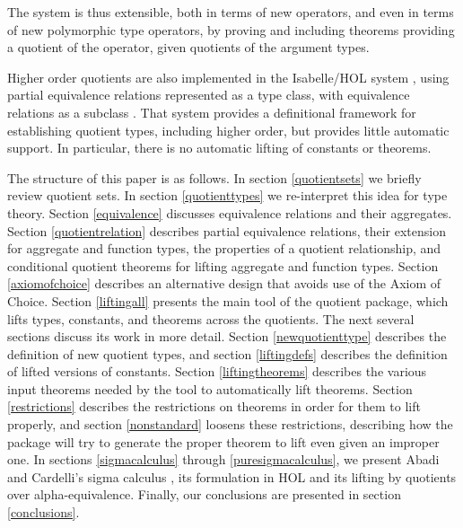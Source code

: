\documentclass[envcountsame,runningheads]{llncs}
\newcommand{\quotient}{partial equivalence}
\begin{document}
The system is thus extensible, both in terms of new operators, and even
in terms of new polymorphic type operators,
by proving and including
theorems providing
a quotient
of the operator,
given quotients
of the argument types.

Higher order quotients are also implemented in the Isabelle/HOL system
\cite{NiPaWe02},
using \quotient{} relations represented as a type class,
with equivalence relations as a subclass
\cite{Slo97}.
That system provides a definitional framework for establishing quotient
types, including higher order, but provides little automatic support.
In particular, there is
no automatic lifting of constants or theorems.

The structure of this paper is as follows.  In section \ref{quotientsets}
we briefly review quotient sets.  In section \ref{quotienttypes} we
re-interpret this idea for type theory. 
Section \ref{equivalence} discusses equivalence relations and their
aggregates.
Section \ref{quotientrelation} describes \quotient{} relations,
their extension for aggregate and function types,
the properties of a quotient relationship,
and conditional quotient theorems
for lifting aggregate and function types.
Section \ref{axiomofchoice} describes an alternative design
that avoids use of the Axiom of Choice.
Section \ref{liftingall} presents
the main tool of the quotient package, which lifts types, constants,
and theorems across the quotients.
The next several sections discuss
its work
in more detail.
Section \ref{newquotienttype}
describes the definition of new quotient types, and 
section \ref{liftingdefs} describes the definition of lifted versions
of constants.
Section \ref{liftingtheorems} describes the various input theorems needed by
the tool to automatically lift theorems.
Section \ref{restrictions} describes the restrictions on theorems
in order for them to lift properly, and section 
\ref{nonstandard} loosens these restrictions, describing how the
package will try to generate the proper theorem to lift
even given an improper one.
In sections \ref{sigmacalculus} through 
\ref{puresigmacalculus}, we present Abadi and Cardelli's sigma calculus
\cite{AbCa96},
its formulation in HOL and its lifting by quotients over alpha-equivalence.
Finally, our conclusions are presented in section \ref{conclusions}.
\end{document}
